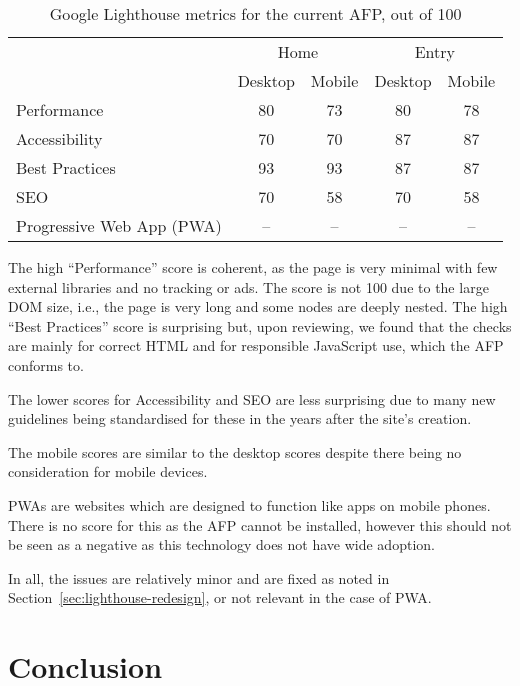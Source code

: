 \documentclass[bsc,frontabs,oneside,singlespacing,parskip,deptreport,logo]{infthesis}
\begin{document}
\begin{table}[h]
\centering
{}
\begin{tabularx}{0.5\textwidth}{lcccc}
                          & \multicolumn{2}{c}{Home} & \multicolumn{2}{c}{Entry} \\
                          & Desktop     & Mobile     & Desktop      & Mobile     \\
Performance               & 80          & 73         & 80           & 78         \\
Accessibility             & 70          & 70         & 87           & 87         \\
Best Practices            & 93          & 93         & 87           & 87         \\
SEO                       & 70          & 58         & 70           & 58         \\
Progressive Web App (PWA) & --          & --         & --           & --        
\end{tabularx}
\caption{Google Lighthouse metrics for the current AFP, out of 100}
\end{table}

The high ``Performance'' score is coherent, as the page is very minimal with few external libraries and no tracking or ads. The score is not 100 due to the large DOM size, i.e., the page is very long and some nodes are deeply nested. The high ``Best Practices'' score is surprising but, upon reviewing, we found that the checks are mainly for correct HTML and for responsible JavaScript use, which the AFP conforms to.

The lower scores for Accessibility and SEO are less surprising due to many new guidelines being standardised for these in the years after the site's creation. 

The mobile scores are similar to the desktop scores despite there being no consideration for mobile devices.

PWAs are websites which are designed to function like apps on mobile phones. There is no score for this as the AFP cannot be installed, however this should not be seen as a negative as this technology does not have wide adoption.

In all, the issues are relatively minor and are fixed as noted in Section~\ref{sec:lighthouse-redesign}, or not relevant in the case of PWA.



\section{Conclusion}
\end{document}
